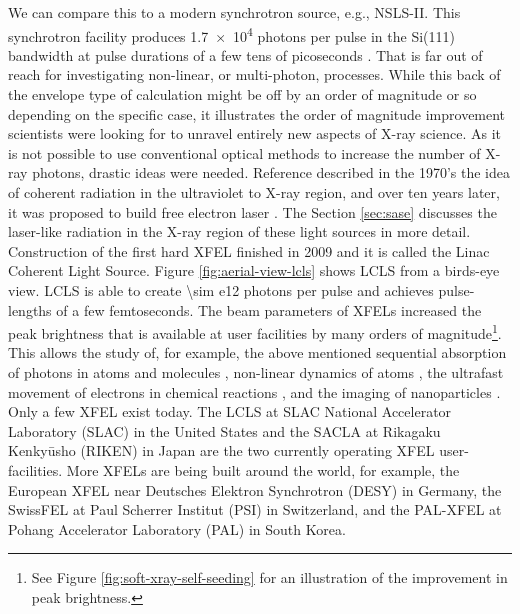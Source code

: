 We can compare this to a modern synchrotron source, e.g., NSLS-II. This synchrotron facility produces \num{1.7e4} photons per pulse in the Si(111) bandwidth at pulse durations of a few tens of picoseconds \citep{Williams-2016-PC}. That is far out of reach for investigating non-linear, or multi-photon, processes. While this back of the envelope type of calculation might be off by an order of magnitude or so depending on the specific case, it illustrates the order of magnitude improvement scientists were looking for to unravel entirely new aspects of X-ray science. As it is not possible to use conventional optical methods to increase the number of X-ray photons, drastic ideas were needed. Reference \citep{Madey-1971-JAP} described in the 1970's the idea of coherent radiation in the ultraviolet to X-ray region, and over ten years later, it was proposed to build free electron laser \citep{Kondratenko-1980-PA,Bonifacio-1984-OC}. The Section \ref{sec:sase} discusses the laser-like radiation in the X-ray region of these light sources in more detail.\\[1\baselineskip]
%
Construction of the first hard XFEL finished in 2009 and it is called the Linac Coherent Light Source. Figure \ref{fig:aerial-view-lcls} shows LCLS from a birds-eye view. LCLS is able to create \num{\sim e12} photons per pulse and achieves pulse-lengths of a few femtoseconds. The beam parameters of XFELs increased the peak brightness that is available at user facilities by many orders of magnitude\footnote{See Figure \ref{fig:soft-xray-self-seeding} for an illustration of the improvement in peak brightness.}. This allows the study of, for example, the above mentioned sequential absorption of photons in atoms and molecules \cite{Young-2010-Nature,Berrah-2011-PNAS}, non-linear dynamics of atoms \cite{Rohringer-2012-Nature}, the ultrafast movement of electrons in chemical reactions \cite{Dell-Angela-2013-Science,Picon-2016-NatComm}, and the imaging of nanoparticles \cite{Seibert-2011-Nature,Gorkhover-2012-PRL}.\\[1\baselineskip]
%
Only a few XFEL exist today. The LCLS at SLAC National Accelerator Laboratory (SLAC) in the United States and the SACLA at Rikagaku Kenkyūsho (RIKEN) in Japan are the two currently operating XFEL user-facilities. More XFELs are being built around the world, for example, the European XFEL near Deutsches Elektron Synchrotron (DESY) in Germany, the SwissFEL at Paul Scherrer Institut (PSI) in Switzerland, and the PAL-XFEL at Pohang Accelerator Laboratory (PAL) in South Korea.
%
%
%
